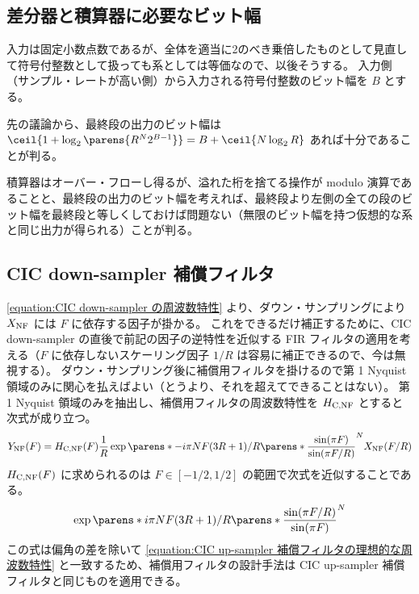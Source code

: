     \subsection{差分器と積算器に必要なビット幅}
        入力は固定小数点数であるが、全体を適当に2のべき乗倍したものとして見直して符号付整数として扱っても系としては等価なので、以後そうする。
        入力側（サンプル・レートが高い側）から入力される符号付整数のビット幅を $B$ とする。
        \par
        先の議論から、最終段の出力のビット幅は $\ceil{1 + \log_2\parens{R^N 2^{B-1}}} = B + \ceil{N\log_2 R}$ あれば十分であることが判る。
        \par
        積算器はオーバー・フローし得るが、溢れた桁を捨てる操作が modulo 演算であることと、最終段の出力のビット幅を考えれば、最終段より左側の全ての段のビット幅を最終段と等しくしておけば問題ない（無限のビット幅を持つ仮想的な系と同じ出力が得られる）ことが判る。
    \subsection{CIC down-sampler 補償フィルタ}
        \cref{equation:CIC down-sampler の周波数特性} より、ダウン・サンプリングにより $X_\text{NF}$ には $F$ に依存する因子が掛かる。
        これをできるだけ補正するために、CIC down-sampler の直後で前記の因子の逆特性を近似する FIR フィルタの適用を考える（$F$ に依存しないスケーリング因子 $1/R$ は容易に補正できるので、今は無視する）。
        ダウン・サンプリング後に補償用フィルタを掛けるので第 1 Nyquist 領域のみに関心を払えばよい（とうより、それを超えてできることはない）。
        第 1 Nyquist 領域のみを抽出し、補償用フィルタの周波数特性を $H_\text{C,NF}$ とすると次式が成り立つ。
        \[ \YNF(F) = \HCNF(F) \frac{1}{R} \exp\parens*{-i\pi N F(3R+1)/R}\parens*{\frac{\sin(\pi F)}{\sin(\pi F/R)}}^N \XNF(F/R) \]
        $H_\text{C,NF}(F)$ に求められるのは $F \in [-1/2,1/2]$ の範囲で次式を近似することである。
        \begin{equation}
            \exp\parens*{i\pi N F(3R+1)/R}\parens*{\frac{\sin(\pi F/R)}{\sin(\pi F)}}^N
        \end{equation}
        この式は偏角の差を除いて \cref{equation:CIC up-sampler 補償フィルタの理想的な周波数特性} と一致するため、補償用フィルタの設計手法は CIC up-sampler 補償フィルタと同じものを適用できる。
